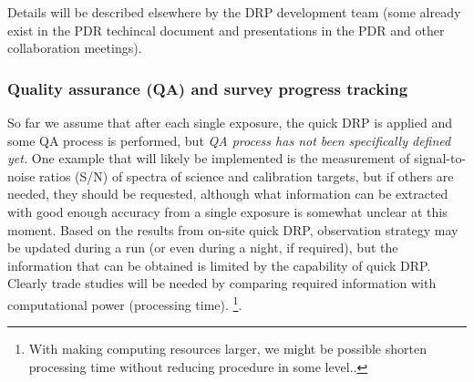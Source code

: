 \documentclass[a4paper,notitlepage]{article}
\begin{document}
Details will be described elsewhere by the DRP development team (some
already exist in the PDR techincal document and presentations in the PDR
and other collaboration meetings).


\subsubsection{Quality assurance (QA) and survey progress tracking}

So far we assume that after each single exposure, the quick DRP is
applied and some QA process is performed, but {\it QA process has not
been specifically defined yet.}  One example that will likely be
implemented is the measurement of signal-to-noise ratios (S/N) of
spectra of science and calibration targets, but if others are needed,
they should be requested, although what information can be extracted
with good enough accuracy from a single exposure is somewhat unclear at
this moment. Based on the results from on-site quick DRP, observation
strategy may be updated during a run (or even during a night, if
required), but the information that can be obtained is limited by the
capability of quick DRP. Clearly trade studies will be needed by
comparing required information with computational power (processing
time). \footnote{With making computing resources larger, we might be
possible shorten processing time without reducing procedure in some
level..}.
\end{document}
